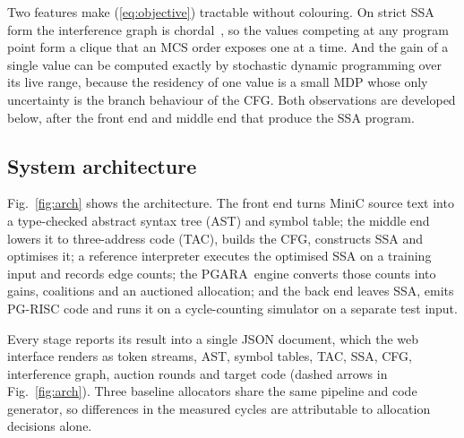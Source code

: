 \documentclass[conference]{IEEEtran}
\newcommand{\MG}{PGARA}
\begin{document}
Two features make (\ref{eq:objective}) tractable without colouring.
On strict SSA form the interference graph is chordal~\cite{hack2006ssa},
so the values competing at any program point form a clique that an MCS
order exposes one at a time. And the gain of a single value can be
computed exactly by stochastic dynamic programming over its live range,
because the residency of one value is a small MDP whose only uncertainty
is the branch behaviour of the CFG. Both observations are developed
below, after the front end and middle end that produce the SSA program.

\subsection{System architecture}

Fig.~\ref{fig:arch} shows the architecture. The front end turns MiniC
source text into a type-checked abstract syntax tree (AST) and symbol
table; the middle end lowers it to three-address code (TAC), builds the
CFG, constructs SSA and optimises it; a reference interpreter executes
the optimised SSA on a training input and records edge counts; the
\MG\ engine converts those counts into gains, coalitions and an
auctioned allocation; and the back end leaves SSA, emits PG-RISC code
and runs it on a cycle-counting simulator on a separate test input.

Every stage reports its result into a single JSON document, which the
web interface renders as token streams, AST, symbol tables, TAC, SSA,
CFG, interference graph, auction rounds and target code (dashed arrows
in Fig.~\ref{fig:arch}). Three baseline allocators share the same
pipeline and code generator, so differences in the measured cycles
are attributable to allocation decisions alone.
\end{document}
